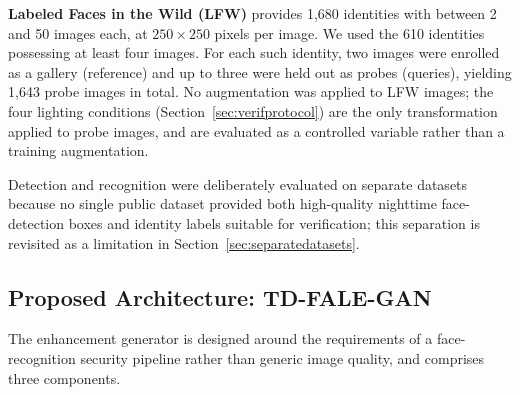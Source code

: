 \documentclass[conference]{IEEEtran}
\begin{document}
\textbf{Labeled Faces in the Wild (LFW)} \cite{lfw} provides
1{,}680 identities with between 2 and 50 images each, at
$250\times250$ pixels per image. We used the 610 identities
possessing at least four images. For each such identity, two
images were enrolled as a gallery (reference) and up to three
were held out as probes (queries), yielding 1{,}643 probe images
in total. No augmentation was applied to LFW images; the four
lighting conditions (Section~\ref{sec:verifprotocol}) are the only
transformation applied to probe images, and are evaluated as a
controlled variable rather than a training augmentation.

Detection and recognition were deliberately evaluated on separate
datasets because no single public dataset provided both
high-quality nighttime face-detection boxes and identity labels
suitable for verification; this separation is revisited as a
limitation in Section~\ref{sec:separatedatasets}.

\subsection{Proposed Architecture: TD-FALE-GAN}
\label{sec:proposedarch}
The enhancement generator is designed around the requirements of
a face-recognition security pipeline rather than generic image
quality, and comprises three components.
\end{document}
